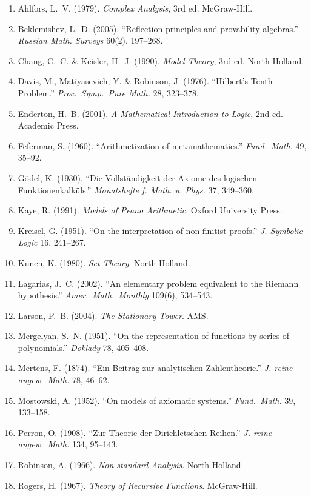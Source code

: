\begin{enumerate}[leftmargin=*]
\item Ahlfors, L.~V. (1979). \emph{Complex Analysis}, 3rd ed. McGraw-Hill.
\item Beklemishev, L.~D. (2005). ``Reflection principles and provability algebras.'' \emph{Russian Math. Surveys} 60(2), 197--268.
\item Chang, C.~C. \& Keisler, H.~J. (1990). \emph{Model Theory}, 3rd ed. North-Holland.
\item Davis, M., Matiyasevich, Y. \& Robinson, J. (1976). ``Hilbert's Tenth Problem.'' \emph{Proc.\ Symp.\ Pure Math.} 28, 323--378.
\item Enderton, H.~B. (2001). \emph{A Mathematical Introduction to Logic}, 2nd ed. Academic Press.
\item Feferman, S. (1960). ``Arithmetization of metamathematics.'' \emph{Fund.\ Math.} 49, 35--92.
\item G\"odel, K. (1930). ``Die Vollst\"andigkeit der Axiome des logischen Funktionenkalk\"uls.'' \emph{Monatshefte f. Math. u. Phys.} 37, 349--360.
\item Kaye, R. (1991). \emph{Models of Peano Arithmetic}. Oxford University Press.
\item Kreisel, G. (1951). ``On the interpretation of non-finitist proofs.'' \emph{J. Symbolic Logic} 16, 241--267.
\item Kunen, K. (1980). \emph{Set Theory}. North-Holland.
\item Lagarias, J.~C. (2002). ``An elementary problem equivalent to the Riemann hypothesis.'' \emph{Amer.\ Math.\ Monthly} 109(6), 534--543.
\item Larson, P.~B. (2004). \emph{The Stationary Tower}. AMS.
\item Mergelyan, S.~N. (1951). ``On the representation of functions by series of polynomials.'' \emph{Doklady} 78, 405--408.
\item Mertens, F. (1874). ``Ein Beitrag zur analytischen Zahlentheorie.'' \emph{J. reine angew.\ Math.} 78, 46--62.
\item Mostowski, A. (1952). ``On models of axiomatic systems.'' \emph{Fund.\ Math.} 39, 133--158.
\item Perron, O. (1908). ``Zur Theorie der Dirichletschen Reihen.'' \emph{J. reine angew.\ Math.} 134, 95--143.
\item Robinson, A. (1966). \emph{Non-standard Analysis}. North-Holland.
\item Rogers, H. (1967). \emph{Theory of Recursive Functions}. McGraw-Hill.

\end{enumerate}
